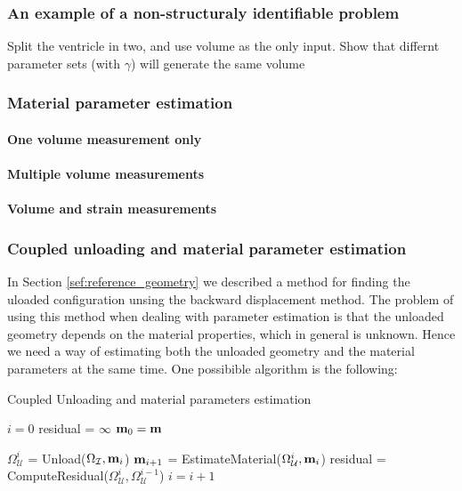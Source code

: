 \subsubsection{An example of a non-structuraly identifiable problem}
Split the ventricle in two, and use volume as the only input.
Show that differnt parameter sets (with $\gamma$) will generate the
same volume



\subsubsection{Material parameter estimation}

\paragraph{One volume measurement only}

\paragraph{Multiple volume measurements}

\paragraph{Volume and strain measurements}

\subsubsection{Coupled unloading and material parameter estimation}
In Section \ref{sef:reference_geometry} we described a method for
finding the uloaded configuration unsing the backward displacement
method. The problem of using this method when dealing with parameter
estimation is that the unloaded geometry depends on the material
properties, which in general is unknown. Hence we need a way of
estimating both the unloaded geometry and the material parameters at
the same time. One possibible algorithm is the following:



\begin{algorithm}
\caption{Coupled Unloading and material parameters estimation}\label{alg:unloaded_material}
\begin{algorithmic}[1]
  \State $i = 0$
  \State residual = $\infty$
  \State $\mathbf{m}_0 =  \mathbf{m}$ 

  \State $\Omega_{\mathcal{U}}^i$ = Unload($\Omega_{\mathcal{I}}, \mathbf{m}_i$) 
  \State $\mathbf{m}_{i+1}$ = EstimateMaterial($\Omega_{\mathcal{U}}^i,
  \mathbf{m}_i$) 
  \State residual = ComputeResidual($\Omega_{\mathcal{U}}^i,
  \Omega_{\mathcal{U}}^{i-1}$)
  \State $i = i +1$
 
  \EndWhile
\end{algorithmic}
\end{algorithm}


